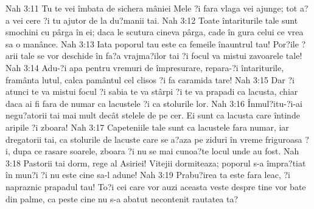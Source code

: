 Nah 3:11  Tu te vei îmbata de sichera mâniei Mele ?i fara vlaga vei ajunge; tot a?a vei cere ?i tu ajutor de la du?manii tai.
Nah 3:12  Toate întariturile tale sunt smochini cu pârga în ei; daca le scutura cineva pârga, cade în gura celui ce vrea sa o manânce.
Nah 3:13  Iata poporul tau este ca femeile înauntrul tau! Por?ile ?arii tale se vor deschide în fa?a vrajma?ilor tai ?i focul va mistui zavoarele tale!
Nah 3:14  Adu-?i apa pentru vremuri de împresurare, repara-?i întariturile, framânta lutul, calca pamântul cel clisos ?i fa caramida tare!
Nah 3:15  Dar ?i atunci te va mistui focul ?i sabia te va stârpi ?i te va prapadi ca lacusta, chiar daca ai fi fara de numar ca lacustele ?i ca stolurile lor.
Nah 3:16  Înmul?itu-?i-ai negu?atorii tai mai mult decât stelele de pe cer. Ei sunt ca lacusta care întinde aripile ?i zboara!
Nah 3:17  Capeteniile tale sunt ca lacustele fara numar, iar dregatorii tai, ca stolurile de lacuste care se a?aza pe ziduri în vreme friguroasa ?i, dupa ce rasare soarele, zboara ?i nu se mai cunoa?te locul unde au fost.
Nah 3:18  Pastorii tai dorm, rege al Asiriei! Vitejii dormiteaza; poporul s-a împra?tiat în mun?i ?i nu este cine sa-l adune!
Nah 3:19  Prabu?irea ta este fara leac, ?i napraznic prapadul tau! To?i cei care vor auzi aceasta veste despre tine vor bate din palme, ca peste cine nu s-a abatut necontenit rautatea ta?


